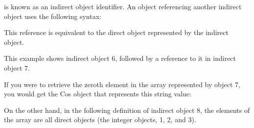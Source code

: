 \documentclass[letterpaper,12pt,english,openany,oneside]{sphinxmanual}
\begin{document}
  is known as an indirect object identifier. An object referencing another indirect object uses the following syntax:

\begin{sphinxVerbatim}[commandchars=\\\{\}]
   
\end{sphinxVerbatim}

This reference is equivalent to the direct object represented by the indirect object.

This example shows indirect object 6, followed by a reference to it in indirect object 7.

\begin{sphinxVerbatim}[commandchars=\\\{\}]
    
         

    
    \PYG{p}{[}    \PYG{p}{]}          
\end{sphinxVerbatim}

If you were to retrieve the zeroth element in the array represented by object 7, you would get the Cos object that represents this string value:

\begin{sphinxVerbatim}[commandchars=\\\{\}]
   
\end{sphinxVerbatim}

On the other hand, in the following definition of indirect object 8, the elements of the array are all direct objects (the integer objects, 1, 2, and 3).

\begin{sphinxVerbatim}[commandchars=\\\{\}]
  
    \PYG{p}{[}  \PYG{p}{]}
\end{sphinxVerbatim}
\end{document}
